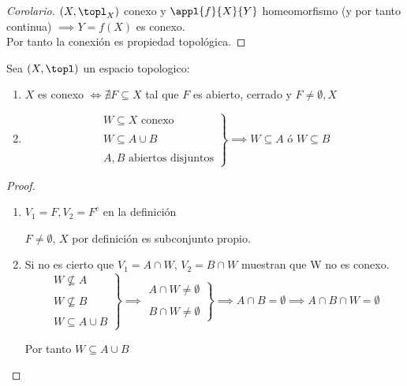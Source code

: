 \documentclass{apuntes}
\begin{document}
\begin{proof}[Corolario]
	$(X, \topl_X)$ conexo y $\appl{f}{X}{Y}$ homeomorfismo (y por tanto continua) $\implies Y = f(X)$ es conexo.\\
	Por tanto la conexión es propiedad topológica. 
\end{proof}


\begin{prop}
	Sea $(X,\topl)$ un espacio topologico:

	\begin{enumerate}
		\item $X$ es conexo $\Leftrightarrow ∄F ⊆ X$ tal que $F$ es abierto, cerrado y $F≠ \emptyset, X$

		\item
		\[\left.
			\begin{array}{cc}
				W ⊆ X \text{\ conexo} \\ \\
				W ⊆ A \cup B \\ \\
				A,B \text{\ abiertos disjuntos}
			\end{array}
		\right\} \implies W ⊆ A \text{\ ó \ } W ⊆ B \]
	\end{enumerate}
\end{prop}

\begin{proof}
	\begin{enumerate}
		\item $V_1 = F, V_2 = F^c$ en la definición
		\begin{remark}
			$F ≠ \emptyset$, $X$ por definición es subconjunto propio.
		\end{remark}

		\item Si no es cierto que $V_1 = A \cap W$, $ V_2 = B \cap W$ muestran que W no es conexo.\\
		\[\left.
			\begin{array}{cc}
				W \nsubseteq A \\ \\
				W \nsubseteq B \\ \\
				W ⊆ A \cup B
			\end{array}
		\right\} \implies
		\left.
			\begin{array}{cc}
				A \cap W ≠ \emptyset \\ \\
				B \cap W ≠ \emptyset
			\end{array}
		\right\} \implies 
		A \cap B = \emptyset \implies A\cap B \cap W = \emptyset
		\]

		Por tanto $W ⊆ A \cup B$
	\end{enumerate}
\end{proof}
 
\end{document}
